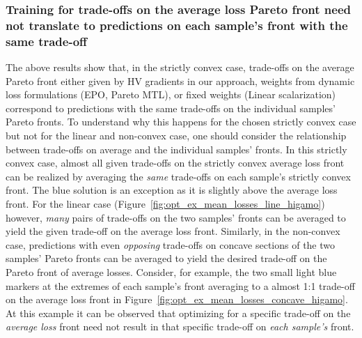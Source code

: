 \subsubsection{Training for trade-offs on the average loss Pareto front need not translate to predictions on each sample's front with the same trade-off}
The above results show that, in the strictly convex case, trade-offs on the average Pareto front either given by HV gradients in our approach, weights from dynamic loss formulations (EPO, Pareto MTL), or fixed weights (Linear scalarization) correspond to predictions with the same trade-offs on the individual samples' Pareto fronts. To understand why this happens for the chosen strictly convex case but not for the linear and non-convex case, one should consider the relationship between trade-offs on average and the individual samples' fronts.
In this strictly convex case, almost all given trade-offs on the strictly convex average loss front can be realized by averaging the \emph{same} trade-offs on each sample's strictly convex front. The blue solution is an exception as it is slightly above the average loss front. 
For the linear case (Figure~\ref{fig:opt_ex_mean_losses_line_higamo}) however, \emph{many} pairs of trade-offs on the two samples' fronts can be averaged to yield the given trade-off on the average loss front. 
Similarly, in the non-convex case, predictions with even \emph{opposing} trade-offs on concave sections of the two samples' Pareto fronts can be averaged to yield the desired trade-off on the Pareto front of average losses. Consider, for example, the two small light blue markers at the extremes of each sample's front averaging to a almost 1:1 trade-off on the average loss front in Figure~\ref{fig:opt_ex_mean_losses_concave_higamo}. At this example it can be observed that optimizing for a specific trade-off on the \emph{average loss} front need not result in that specific trade-off on \emph{each sample's} front. 

